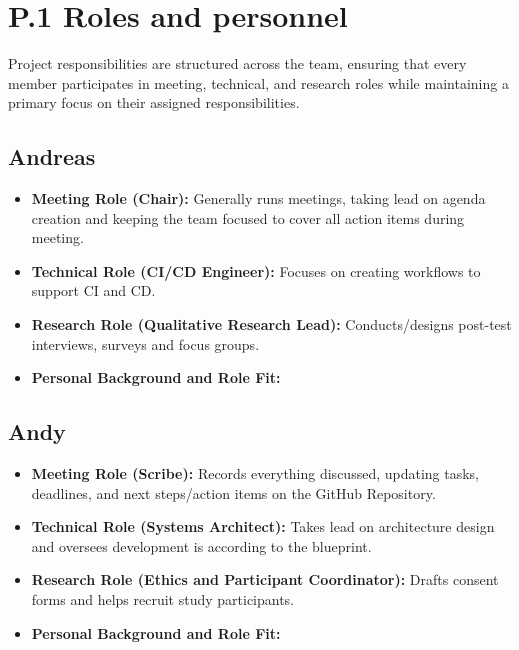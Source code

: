 \section{P.1 Roles and personnel}

Project responsibilities are structured across the team, ensuring that every member participates in meeting, technical, and research roles while maintaining a primary focus on their assigned responsibilities.

\subsection{Andreas}
\begin{itemize}
\item \textbf{Meeting Role (Chair):} Generally runs meetings, taking lead on agenda creation and keeping the team focused to cover all action items during meeting.
\item \textbf{Technical Role (CI/CD Engineer):} Focuses on creating workflows to support CI and CD.
\item \textbf{Research Role (Qualitative Research Lead):} Conducts/designs post-test interviews, surveys and focus groups.
\item \textbf{Personal Background and Role Fit:} 
\end{itemize}

\subsection{Andy}
\begin{itemize}
\item \textbf{Meeting Role (Scribe):} Records everything discussed, updating tasks, deadlines, and next steps/action items on the GitHub Repository.
\item \textbf{Technical Role (Systems Architect):} Takes lead on architecture design and oversees development is according to the blueprint.
\item \textbf{Research Role (Ethics and Participant Coordinator):} Drafts consent forms and helps recruit study participants.
\item \textbf{Personal Background and Role Fit:} 
\end{itemize}

